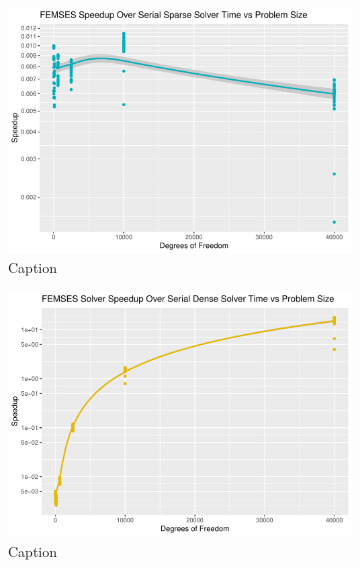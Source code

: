 \begin{figure}
	\centering
	\begin{subfigure}{0.48\linewidth}
		\centering
		\includegraphics[width = \linewidth]{Plots/solve_femses_sparse_cpu_speedup_vs_n}
		\caption{Caption}
		\label{fig:solve_femses_sparse}
	\end{subfigure}\hfill
	\begin{subfigure}{0.48\linewidth}
		\centering
		\includegraphics[width=\linewidth]{Plots/solve_femses_dense_cpu_speedup_vs_n}
		\caption{Caption}
		\label{fig:solve_femses_dense}
	\end{subfigure}\\
	\begin{subfigure}{0.48\linewidth}
		\centering

\end{subfigure}
\end{figure}
